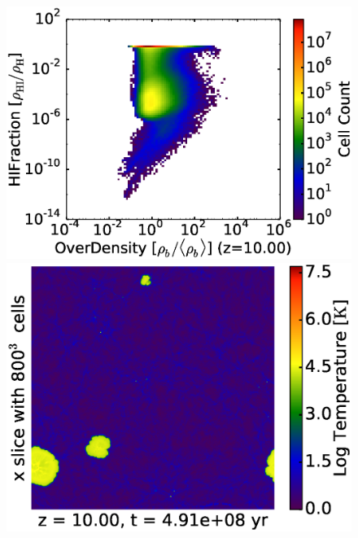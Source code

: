 
\begin{figure}[!tp]
	\begin{minipage}[h]{0.33\linewidth}
	\centering
	\includegraphics[trim = 7mm 9mm 1mm 7mm, clip, width=1.0\textwidth]{1_1_RD0029OverDensityHIFraction.eps}
	\end{minipage}
\hspace*{-2.00mm}
	\begin{minipage}[h]{0.33\linewidth}
	\centering
	\includegraphics[trim = 10mm 0mm 7mm 7mm, clip, width=1.0\textwidth]{1_2_slice_Temperature_x_RD0029.eps}
	\end{minipage}
\hspace*{-2.00mm}

\end{figure}
